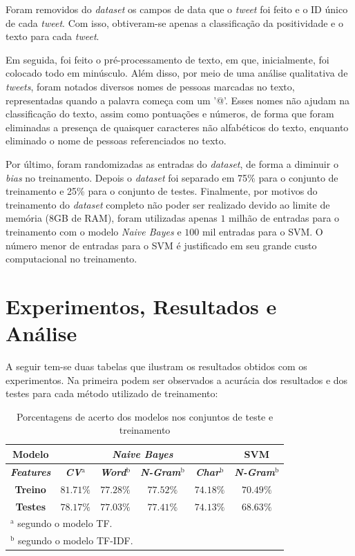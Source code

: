 \documentclass[conference]{IEEEtran}
\begin{document}
Foram removidos do \textit{dataset} os campos de data que o \textit{tweet} foi feito e o ID único de cada \textit{tweet}. Com isso, obtiveram-se apenas a classificação da positividade e o texto para cada \textit{tweet}.

Em seguida, foi feito o pré-processamento de texto, em que, inicialmente, foi colocado todo em minúsculo. Além disso, por meio de uma análise qualitativa de \textit{tweets}, foram notados diversos nomes de pessoas marcadas no texto, representadas quando a palavra começa com um '@'. Esses nomes não ajudam na classificação do texto, assim como pontuações e números, de forma que foram eliminadas a presença de quaisquer caracteres não alfabéticos do texto, enquanto eliminado o nome de pessoas referenciados no texto.

Por último, foram randomizadas as entradas do \textit{dataset}, de forma a diminuir o \textit{bias} no treinamento. Depois o \textit{dataset} foi separado em 75\% para o conjunto de treinamento e 25\% para o conjunto de testes. Finalmente, por motivos do treinamento do \textit{dataset} completo não poder ser realizado devido ao limite de memória (8GB de RAM), foram utilizadas apenas $1$ milhão de entradas para o treinamento com o modelo \textit{Naive Bayes} e $100$ mil entradas para o SVM. O número menor de entradas para o SVM é justificado em seu grande custo computacional no treinamento.

\section{Experimentos, Resultados e Análise}

A seguir tem-se duas tabelas que ilustram os resultados obtidos com os experimentos. Na primeira podem ser observados a acurácia dos resultados e dos testes para cada método utilizado de treinamento:

\begin{table}[htbp]

\caption{Porcentagens de acerto dos modelos nos conjuntos de teste e treinamento}
\begin{center}
\begin{tabular}{|c|c|c|c|c|c|} \hline
\textbf{Modelo} & \multicolumn{4}{|c|}{\textbf{\textit{Naive Bayes}}} & \textbf{SVM} \\ \hline
\textbf{\textit{Features}} & \textbf{\textit{CV}}$^{\mathrm{a}}$ &  \textbf{\textit{Word}}$^{\mathrm{b}}$ & \textbf{\textit{N-Gram}$^{\mathrm{b}}$} & \textbf{\textit{Char}$^{\mathrm{b}}$} & \textbf{\textit{N-Gram}$^{\mathrm{b}}$} \\ \hline
\textbf{Treino} & $81.71\%$ & $77.28\%$ & $77.52\%$ & $74.18\%$ & $70.49\%$ \\
\textbf{Testes} & $78.17\%$ & $77.03\%$ & $77.41\%$ & $74.13\%$ & $68.63\%$ \\
\hline
\multicolumn{6}{l}{$^{\mathrm{a}}$ segundo o modelo TF.}\\
\multicolumn{6}{l}{$^{\mathrm{b}}$ segundo o modelo TF-IDF.}
\end{tabular}
\label{tab1}
\end{center}

\end{table}
\end{document}
